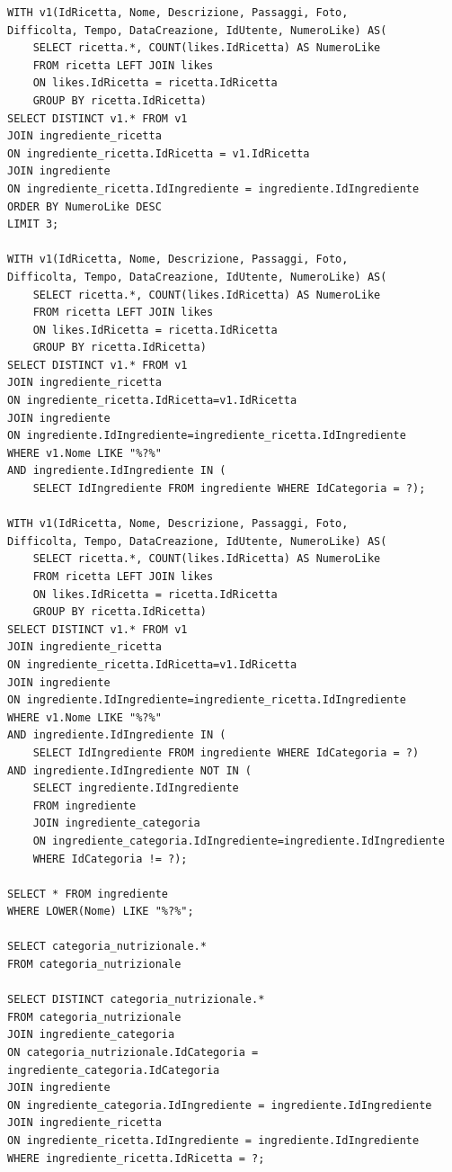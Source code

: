 ﻿\documentclass[a4paper,12pt]{report}
\begin{document}
\begin{verbatim}
WITH v1(IdRicetta, Nome, Descrizione, Passaggi, Foto,
Difficolta, Tempo, DataCreazione, IdUtente, NumeroLike) AS(
    SELECT ricetta.*, COUNT(likes.IdRicetta) AS NumeroLike
    FROM ricetta LEFT JOIN likes
    ON likes.IdRicetta = ricetta.IdRicetta
    GROUP BY ricetta.IdRicetta)
SELECT DISTINCT v1.* FROM v1
JOIN ingrediente_ricetta
ON ingrediente_ricetta.IdRicetta = v1.IdRicetta
JOIN ingrediente
ON ingrediente_ricetta.IdIngrediente = ingrediente.IdIngrediente
ORDER BY NumeroLike DESC
LIMIT 3;

WITH v1(IdRicetta, Nome, Descrizione, Passaggi, Foto, 
Difficolta, Tempo, DataCreazione, IdUtente, NumeroLike) AS(
    SELECT ricetta.*, COUNT(likes.IdRicetta) AS NumeroLike
    FROM ricetta LEFT JOIN likes
    ON likes.IdRicetta = ricetta.IdRicetta
    GROUP BY ricetta.IdRicetta)
SELECT DISTINCT v1.* FROM v1
JOIN ingrediente_ricetta
ON ingrediente_ricetta.IdRicetta=v1.IdRicetta
JOIN ingrediente
ON ingrediente.IdIngrediente=ingrediente_ricetta.IdIngrediente
WHERE v1.Nome LIKE "%?%"
AND ingrediente.IdIngrediente IN (
    SELECT IdIngrediente FROM ingrediente WHERE IdCategoria = ?);

WITH v1(IdRicetta, Nome, Descrizione, Passaggi, Foto, 
Difficolta, Tempo, DataCreazione, IdUtente, NumeroLike) AS(
    SELECT ricetta.*, COUNT(likes.IdRicetta) AS NumeroLike
    FROM ricetta LEFT JOIN likes
    ON likes.IdRicetta = ricetta.IdRicetta
    GROUP BY ricetta.IdRicetta)
SELECT DISTINCT v1.* FROM v1
JOIN ingrediente_ricetta
ON ingrediente_ricetta.IdRicetta=v1.IdRicetta
JOIN ingrediente
ON ingrediente.IdIngrediente=ingrediente_ricetta.IdIngrediente
WHERE v1.Nome LIKE "%?%"
AND ingrediente.IdIngrediente IN (
    SELECT IdIngrediente FROM ingrediente WHERE IdCategoria = ?)
AND ingrediente.IdIngrediente NOT IN (
    SELECT ingrediente.IdIngrediente
    FROM ingrediente
    JOIN ingrediente_categoria
    ON ingrediente_categoria.IdIngrediente=ingrediente.IdIngrediente
    WHERE IdCategoria != ?);

SELECT * FROM ingrediente
WHERE LOWER(Nome) LIKE "%?%";

SELECT categoria_nutrizionale.*
FROM categoria_nutrizionale

SELECT DISTINCT categoria_nutrizionale.*
FROM categoria_nutrizionale
JOIN ingrediente_categoria
ON categoria_nutrizionale.IdCategoria = ingrediente_categoria.IdCategoria
JOIN ingrediente
ON ingrediente_categoria.IdIngrediente = ingrediente.IdIngrediente
JOIN ingrediente_ricetta
ON ingrediente_ricetta.IdIngrediente = ingrediente.IdIngrediente
WHERE ingrediente_ricetta.IdRicetta = ?;


\end{verbatim}
\end{document}
